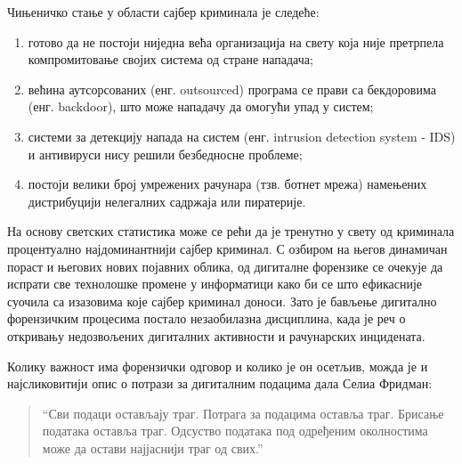 \documentclass[a4paper]{article}
\begin{document}
        Чињеничко стање у области сајбер криминала је следеће:
        \begin{enumerate}
            \item готово да не постоји ниједна већа организација на свету која није претрпела компромитовање својих система од стране нападача;
            \item већина аутсорсованих (енг. outsourced) програма се прави са бекдоровима (енг. backdoor), што може нападачу да омогући упад у систем;
            \item системи за детекцију напада на систем (енг. intrusion detection system - IDS) и антивируси нису решили безбедносне проблеме;
            \item постоји велики број умрежених рачунара (тзв. ботнет мрежа) намењених дистрибуцији нелегалних садржаја или пиратерије.
        \end{enumerate}
        На основу светских статистика може се рећи да је тренутно у свету од криминала процентуално најдоминантнији сајбер криминал. С озбиром на његов динамичан пораст и његових нових појавних облика, од дигиталне форензике се очекује да испрати све технолошке промене у информатици како би се што ефикасније суочила са изазовима које сајбер криминал доноси. Зато је бављење дигитално форензичким процесима постало незаобилазна дисциплина, када је реч о откривању недозвољених дигиталних активности и рачунарских инцидената.

        Колику важност има форензички одговор и колико је он осетљив, можда је и најсликовитији опис о потрази за дигиталним подацима дала Селиа Фридман\cite{fridmanCitat}:
        \begin{quote}
        “Сви подаци остављају траг. Потрага за подацима оставља траг. Брисање података оставља траг. Одсуство података под одређеним околностима може да остави најјаснији траг од свих.”
        \end{quote}
        
\end{document}
